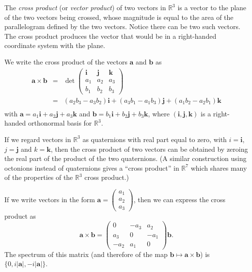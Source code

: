 \documentclass[12pt]{article}
\def\R{\mathbb{R}}
\def\vec#1{\mathbf{#1}}   %
\begin{document}

The \emph{cross product} (or \emph{vector product}) of two vectors in $\R^3$ is a vector  to the plane of the two vectors being crossed, whose magnitude is equal to the area of the parallelogram defined by the two vectors. Notice there can be two such vectors. The cross product produces the vector that would be in a right-handed coordinate system with the plane.

We write the cross product of the vectors $\vec{a}$ and $\vec{b}$ as
\begin{eqnarray*}
\vec{a}\times\vec{b} &=& \det\left(\begin{array}{ccc}\vec{i} & \vec{j} & \vec{k}\\ a_1 & a_2 & a_3\\ b_1 & b_2 & b_3\end{array}\right) \\
 &=& (a_2b_3-a_3b_2)\vec{i} + (a_3b_1-a_1b_3)\vec{j} + (a_1b_2-a_2b_1)\vec{k} \\
\end{eqnarray*}
with $\vec{a}=a_1\vec{i}+a_2\vec{j}+a_3\vec{k}$ and $\vec{b}=b_1\vec{i} + b_2\vec{j}+b_3\vec{k}$, where $(\vec{i},\vec{j},\vec{k})$ is a right-handed orthonormal basis for $\R^3$.

If we regard vectors in $\R^3$ as quaternions with real part equal to zero, with $i=\vec{i}$, $j=\vec{j}$ and $k=\vec{k}$, then the cross product of two vectors can be obtained by zeroing the real part of the product of the two quaternions. (A similar construction using octonions instead of quaternions gives a ``cross product'' in $\R^7$ which shares many of the properties of the $\R^3$ cross product.)

If we write vectors in the form $\vec{a}=\left(\begin{array}{c}a_1 \\ a_2 \\ a_3\end{array}\right)$, then we can express the cross product as
\[
\vec{a}\times\vec{b} = \left(\begin{array}{ccc}0 & -a_3 & a_2 \\ a_3 & 0 & -a_1 \\ -a_2 & a_1 & 0\end{array}\right)\vec{b}.
\]
The spectrum of this matrix
(and therefore of the map $\vec{b}\mapsto\vec{a}\times\vec{b}$)
is $\{0, i|\vec{a}|, -i|\vec{a}| \}$.
\end{document}

